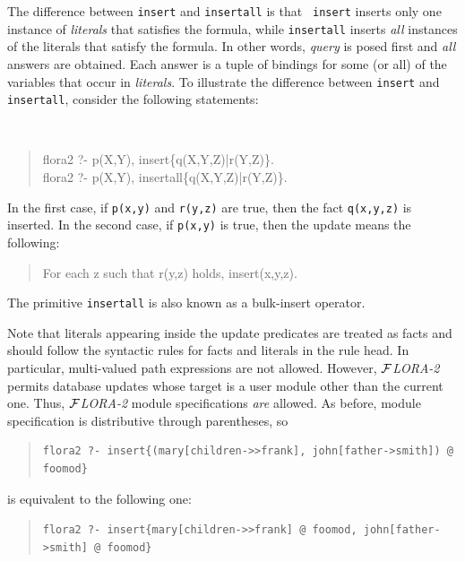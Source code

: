 \documentclass[11pt]{article}
\newcommand{\FLORA}{{\mbox{${\cal F}${\small\it LORA}\rm\emph{-2}}}\xspace}
\begin{document}
The difference between {\tt insert} and {\tt insertall} is that {\tt
  insert} inserts only one instance of \emph{literals} that satisfies the
formula, while {\tt insertall} inserts \emph{all} instances of the literals
that satisfy the formula. In other words, \emph{query} is posed first and
\emph{all} answers are obtained. Each answer is a tuple of bindings for
some (or all) of the variables that occur in \emph{literals}.  To
illustrate the difference between {\tt insert} and {\tt insertall},
consider the following statements:
{\tt
\begin{quote}
  flora2  ?- p(X,Y), insert\{q(X,Y,Z)|r(Y,Z)\}.\\
  flora2  ?- p(X,Y), insertall\{q(X,Y,Z)|r(Y,Z)\}.
\end{quote}
}
In the first case, if {\tt p(x,y)} and {\tt r(y,z)} are true, then the fact
{\tt q(x,y,z)} is inserted. In the second case, if {\tt p(x,y)} is true,
then the update means the following:
\begin{quote}
  For each z such that r(y,z) holds, insert(x,y,z).
\end{quote}
The primitive {\tt insertall} is also known as a bulk-insert operator.

Note that literals appearing inside the update predicates are treated as
facts and should follow the syntactic rules for facts and literals in the
rule head. In particular, multi-valued path expressions are not allowed.
However, \FLORA permits database updates whose target is a user module
other than the current one.  Thus, \FLORA module specifications \emph{are}
allowed. As before, module specification is distributive through
parentheses, so
\begin{quote}
\begin{verbatim}
flora2 ?- insert{(mary[children->>frank], john[father->smith]) @ foomod}
\end{verbatim}
\end{quote}
is equivalent to the following one:
\begin{quote}
\verb|flora2 ?- insert{mary[children->>frank] @ foomod, john[father->smith] @ foomod}|
\end{quote}
\end{document}
